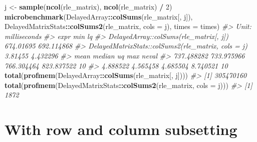 \documentclass[]{book}
\newenvironment{Shaded}{\begin{snugshade}}{\end{snugshade}}
\newcommand{\KeywordTok}[1]{\textcolor[rgb]{0.13,0.29,0.53}{\textbf{#1}}}
\newcommand{\DataTypeTok}[1]{\textcolor[rgb]{0.13,0.29,0.53}{#1}}
\newcommand{\DecValTok}[1]{\textcolor[rgb]{0.00,0.00,0.81}{#1}}
\newcommand{\StringTok}[1]{\textcolor[rgb]{0.31,0.60,0.02}{#1}}
\newcommand{\CommentTok}[1]{\textcolor[rgb]{0.56,0.35,0.01}{\textit{#1}}}
\newcommand{\OperatorTok}[1]{\textcolor[rgb]{0.81,0.36,0.00}{\textbf{#1}}}
\newcommand{\NormalTok}[1]{#1}
\begin{document}
\begin{Shaded}
\begin{Highlighting}[]
\NormalTok{j <-}\StringTok{ }\KeywordTok{sample}\NormalTok{(}\KeywordTok{ncol}\NormalTok{(rle_matrix), }\KeywordTok{ncol}\NormalTok{(rle_matrix) }\OperatorTok{/}\StringTok{ }\DecValTok{2}\NormalTok{)}
\KeywordTok{microbenchmark}\NormalTok{(DelayedArray}\OperatorTok{::}\KeywordTok{colSums}\NormalTok{(rle_matrix[, j]),}
\NormalTok{               DelayedMatrixStats}\OperatorTok{::}\KeywordTok{colSums2}\NormalTok{(rle_matrix, }\DataTypeTok{cols =}\NormalTok{ j),}
               \DataTypeTok{times =}\NormalTok{ times)}
\CommentTok{#> Unit: milliseconds}
\CommentTok{#>                                                expr       min         lq}
\CommentTok{#>              DelayedArray::colSums(rle_matrix[, j]) 674.01695 692.114868}
\CommentTok{#>  DelayedMatrixStats::colSums2(rle_matrix, cols = j)   3.81455   4.432296}
\CommentTok{#>        mean     median         uq        max neval}
\CommentTok{#>  737.488282 733.975966 766.304464 823.837522    10}
\CommentTok{#>    4.888522   4.565458   4.685504   8.740521    10}
\KeywordTok{total}\NormalTok{(}\KeywordTok{profmem}\NormalTok{(DelayedArray}\OperatorTok{::}\KeywordTok{colSums}\NormalTok{(rle_matrix[, j])))}
\CommentTok{#> [1] 305470160}
\KeywordTok{total}\NormalTok{(}\KeywordTok{profmem}\NormalTok{(DelayedMatrixStats}\OperatorTok{::}\KeywordTok{colSums2}\NormalTok{(rle_matrix, }\DataTypeTok{cols =}\NormalTok{ j)))}
\CommentTok{#> [1] 1872}
\end{Highlighting}
\end{Shaded}

\section{With row and column
subsetting}\label{with-row-and-column-subsetting}
\end{document}
